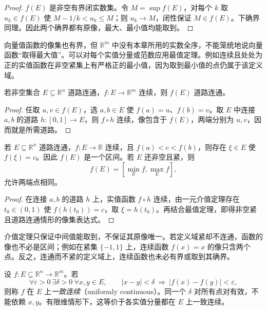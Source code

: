 \documentclass[UTF8,12pt,a4paper,fontset=fandol]{ctexbook}
\begin{document}
\begin{proof}
$f(E)$ 是非空有界闭实数集。令 $M=\sup f(E)$，对每个 $k$ 取 $u_k\in f(E)$ 使 $M-1/k<u_k\leq M$；则 $u_k\to M$，闭性保证 $M\in f(E)$。下确界同理。因此两个确界都有原像，最大、最小值均能取到。
\end{proof}

向量值函数的像集也有界，但 $\mathbb R^m$ 中没有本章所用的实数全序，不能笼统地说向量函数“取得最大值”。可以对每个实值分量或范数应用最值定理。例如连续且处处为正的实值函数在非空紧集上有严格正的最小值，因为取到最小值的点仍属于该定义域。

\begin{theorem}[连续像保持道路连通性]
\label{thm:continuous-image-path-connected}
若非空集合 $E\subseteq\mathbb R^n$ 道路连通，$f:E\to\mathbb R^m$ 连续，则 $f(E)$ 道路连通。
\end{theorem}

\begin{proof}
任取 $u,v\in f(E)$，选 $a,b\in E$ 使 $f(a)=u$、$f(b)=v$。取 $E$ 中连接 $a,b$ 的道路 $h:[0,1]\to E$，则 $f\circ h$ 连续，像包含于 $f(E)$，两端分别为 $u,v$，因而就是所需道路。
\end{proof}

\begin{corollary}[多元连续函数的介值定理]
\label{cor:multivariable-intermediate-value-theorem}
若 $E\subseteq\mathbb R^n$ 道路连通，$f:E\to\mathbb R$ 连续，且 $f(a)<c<f(b)$，则存在 $\xi\in E$ 使 $f(\xi)=c$。因此 $f(E)$ 是一个区间。若 $E$ 还非空且紧，则
\[
    f(E)=[\min_E f,\max_E f],
\]
允许两端点相同。
\end{corollary}

\begin{proof}
在连接 $a,b$ 的道路 $h$ 上，实值函数 $f\circ h$ 连续，由一元介值定理存在 $t_0\in(0,1)$ 使 $f(h(t_0))=c$，取 $\xi=h(t_0)$。再结合最值定理，即得非空紧且道路连通情形的像集表达式。
\end{proof}

介值定理只保证中间值能取到，不保证其原像唯一。若定义域紧却不连通，函数的像也不必是区间；例如在紧集 $\{-1,1\}$ 上，连续函数 $f(x)=x$ 的像只含两个点。反之，连通而不紧的定义域上，连续函数也未必有界或取到其确界。

\begin{definition}
\label{def:uniform-continuity-vector-function}
设 $f:E\subseteq\mathbb R^n\to\mathbb R^m$。若
\[
    \forall\varepsilon>0\ \exists\delta>0\ \forall x,y\in E,
    \qquad |x-y|<\delta\ \Longrightarrow\ |f(x)-f(y)|<\varepsilon,
\]
则称 $f$ 在 $E$ 上\emph{一致连续}（uniformly continuous）。同一个 $\delta$ 对所有点对有效，不能依赖 $x,y$。有限维情形下，这等价于各实值分量都在 $E$ 上一致连续。
\end{definition}
\end{document}
